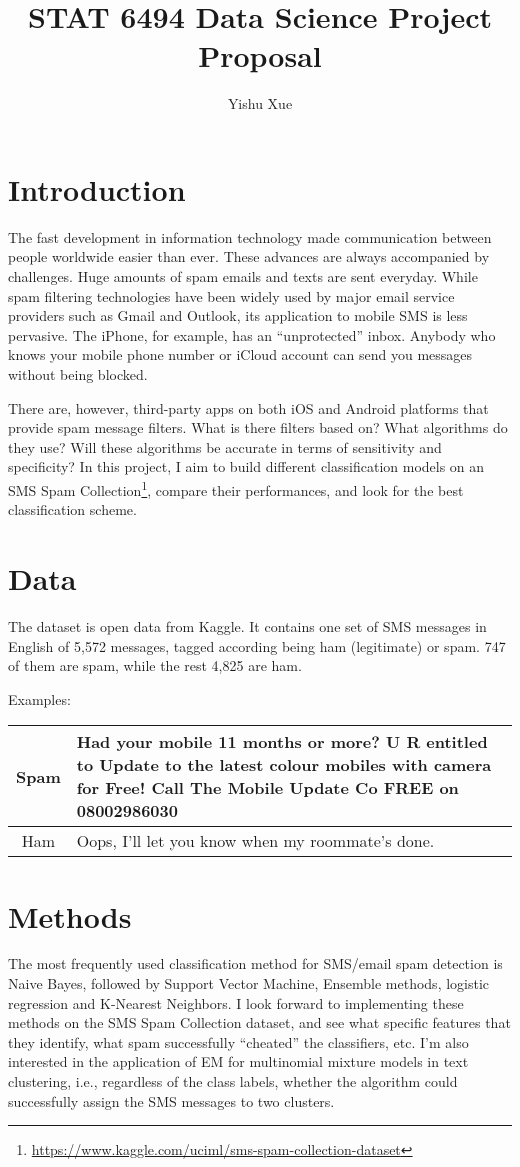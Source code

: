 \documentclass{article}
\date{}
\title{STAT 6494 Data Science Project Proposal}
\author{Yishu Xue}
\begin{document}
\maketitle
\section{Introduction}
The fast development in information technology made communication between people
worldwide easier than ever. These advances are always accompanied by challenges.
Huge amounts of spam emails and texts are sent everyday. While spam filtering 
technologies have been widely used by major email service providers such as 
Gmail and Outlook, its application to mobile SMS is less pervasive. The iPhone, 
for example, has an ``unprotected'' inbox. Anybody who knows your mobile phone
number or iCloud account can send you messages without being blocked. 

There are, however, third-party apps on both iOS and Android platforms
that provide spam message filters. What is there filters based on? What algorithms
do they use? Will these algorithms be accurate in terms of sensitivity and 
specificity? In this project, I aim to build different classification models
on an SMS Spam 
Collection\footnote{\url{https://www.kaggle.com/uciml/sms-spam-collection-dataset}},
compare their performances, and look for the best classification scheme.

\section{Data}
The dataset is open data from Kaggle. It contains one set of SMS messages in 
English of 5,572 messages, tagged according being ham (legitimate) or spam.
747 of them are spam, while the rest 4,825 are ham. 

Examples:

\begin{tabulary}{\textwidth}{|c|L|}\hline
Spam & Had your mobile 11 months or more? U R entitled to Update to 
the latest colour mobiles with camera for Free! Call The Mobile Update Co 
FREE on 08002986030\\ \hline
Ham & Oops, I'll let you know when my roommate's done. \\ \hline
\end{tabulary}

\section{Methods}
The most frequently used classification method for SMS/email spam detection is 
Naive Bayes, 
followed by Support Vector Machine, Ensemble methods, logistic regression
 and K-Nearest 
Neighbors\citep{cormack2008email}. 
I look forward to implementing these methods on the SMS Spam 
Collection dataset, and see what specific features that they identify, what 
spam successfully ``cheated'' the classifiers, etc. I'm also interested in the 
application of EM for multinomial mixture models in text clustering, i.e.,
regardless of the class labels, whether the algorithm could successfully 
assign the SMS messages to two clusters.



\end{document}
